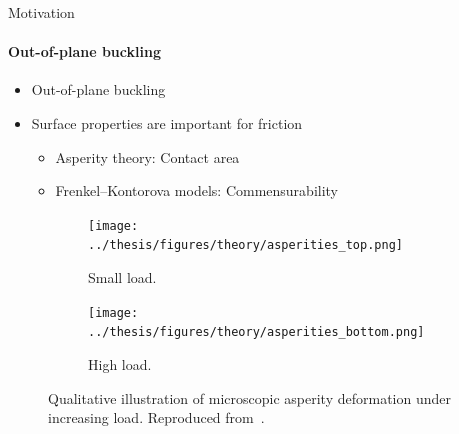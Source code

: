 \documentclass[
	10pt, %
]{beamer}
\begin{document}
\begin{frame}{Motivation}
	\framesubtitle{Out-of-plane buckling}
	\vspace{0.5cm}
	
	\begin{itemize}
		\item Out-of-plane buckling
		\item Surface properties are important for friction
		\begin{itemize}
			\item Asperity theory: Contact area
			\item Frenkel–Kontorova models: Commensurability
		\end{itemize}
	\end{itemize}

	\begin{figure}[H]
		\centering
		\begin{subfigure}[b]{0.49\textwidth}
			\centering
			\texttt{[image: ../thesis/figures/theory/asperities\_top.png]}
			\caption{Small load.}
			\label{fig:asp_left}
		\end{subfigure}
		\hfill
		\begin{subfigure}[b]{0.49\textwidth}
			\centering
			\texttt{[image: ../thesis/figures/theory/asperities\_bottom.png]}
			\caption{High load.}
			\label{fig:asp_right}
		\end{subfigure}
		\caption{Qualitative illustration of microscopic asperity deformation under increasing load. Reproduced from~\cite{wiki:asperities}.}
	\end{figure}
\end{frame}
%
%
%
%
\end{document}
